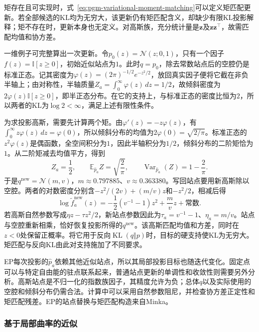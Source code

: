 矩存在且可实现时，式~\eqref{eq:pgm-variational-moment-matching}可以定义矩匹配更新。若全部候选的KL均为无穷大，该更新仍有矩匹配含义，却缺少有限KL投影解释；矩不存在时，更新本身也无定义。对高斯族，充分统计量是$\bm z$及$\bm z\bm z^\top$，故需匹配均值和协方差。

一维例子可完整算出一次更新。令$p_0(z)=\mathcal N(z;0,1)$，只有一个因子$f(z)=\mathbb I[z\geq0]$，初始近似站点为$1$。此时$q=p_0$，除去常数站点后的空腔仍是标准正态。记其密度为$\varphi(z)=(2\pi)^{-1/2}e^{-z^2/2}$，放回真实因子便将它截在非负半轴上；由对称性，半轴质量$Z_a=\int_0^\infty\varphi(z)\,dz=1/2$，故倾斜密度为$2\varphi(z)\mathbb I[z\geq0]$，即半正态分布。在它的支持上，与标准正态的密度比恒为$2$，所以两者的KL为$\log2<\infty$，满足上述有限性条件。

为求投影高斯，需要先计算两个矩。由$\varphi'(z)=-z\varphi(z)$，有$\int_0^\infty z\varphi(z)\,dz=\varphi(0)$，所以倾斜分布的均值为$2\varphi(0)=\sqrt{2/\pi}$。标准正态的$z^2\varphi(z)$是偶函数，全空间积分为$1$，因此半轴积分为$1/2$，倾斜分布的二阶矩恰为$1$。从二阶矩减去均值平方，得到
\[
  Z_a=\frac12,\qquad
  \mathbb E_{\widehat p_a}Z=\sqrt{\frac2\pi},\qquad
  \operatorname{Var}_{\widehat p_a}(Z)=1-\frac2\pi.
\]
于是$q^{\mathrm{new}}=\mathcal N(m,v)$，$m\approx0.797885$、$v\approx0.363380$。写回站点要用新高斯除以空腔。两者的对数密度分别含$-z^2/(2v)+(m/v)z$和$-z^2/2$，相减后得
\[
  \log\widetilde f_a^{\mathrm{new}}(z)
      =-\frac12(v^{-1}-1)z^2+\frac{m}{v}z+\text{常数}.
\]
若高斯自然参数写成$\eta z-\tau z^2/2$，新站点参数因此为$\tau_a=v^{-1}-1$、$\eta_a=m/v$。站点与空腔重新相乘，恰好恢复投影所得的$q^{\mathrm{new}}$。该高斯匹配均值和方差，同时在$z<0$处保留正概率。将它用于反向$\operatorname{KL}(q\Vert p)$时，目标的硬支持使KL为无穷大。矩匹配与反向KL由此对支持施加了不同要求。

EP每次投影的$\widehat p_a$依赖其他近似站点，所以其局部投影目标也随迭代变化。固定点可以与特定自由能的驻点联系起来，普通站点更新的单调性和收敛性则需要另外分析。高斯站点是不归一化的指数族因子，其精度允许为负；总体$q$以及实际使用的空腔和倾斜分布仍需合法。计算中可以采用自然参数阻尼，并检查协方差正定性和矩匹配残差。EP的站点替换与矩匹配构造来自Minka。

\subsubsection{基于局部曲率的近似}

\label{sec:pgm-variational-laplace}

